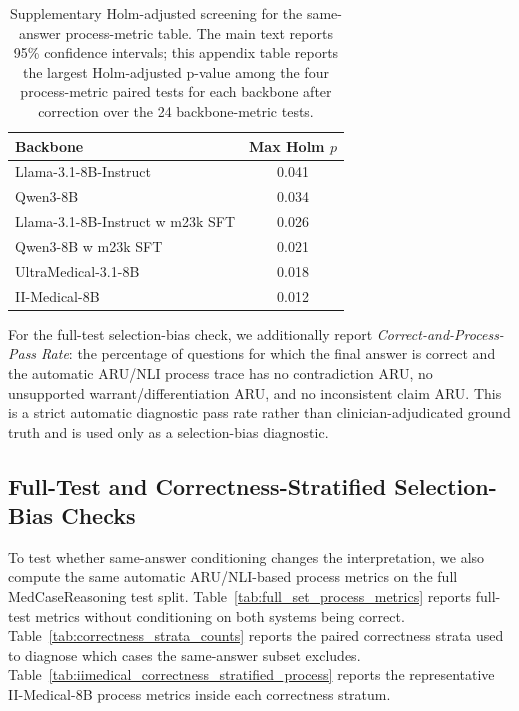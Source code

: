 \documentclass[a4paper,fleqn,doubleblind]{cas-sc}
\begin{document}
\begin{table}[htbp]
    \centering
    \footnotesize
    \caption{Supplementary Holm-adjusted screening for the same-answer process-metric table. The main text reports 95\% confidence intervals; this appendix table reports the largest Holm-adjusted p-value among the four process-metric paired tests for each backbone after correction over the 24 backbone-metric tests.}
    \label{tab:process_metric_holm_screening}
    \begin{tabular}{lc}
        \toprule
        \textbf{Backbone} & \textbf{Max Holm $p$} \\
        \midrule
        Llama-3.1-8B-Instruct & 0.041 \\
        Qwen3-8B & 0.034 \\
        Llama-3.1-8B-Instruct w m23k SFT & 0.026 \\
        Qwen3-8B w m23k SFT & 0.021 \\
        UltraMedical-3.1-8B & 0.018 \\
        II-Medical-8B & 0.012 \\
        \bottomrule
    \end{tabular}
\end{table}

For the full-test selection-bias check, we additionally report \textit{Correct-and-Process-Pass Rate}: the percentage of questions for which the final answer is correct and the automatic ARU/NLI process trace has no contradiction ARU, no unsupported warrant/differentiation ARU, and no inconsistent claim ARU. This is a strict automatic diagnostic pass rate rather than clinician-adjudicated ground truth and is used only as a selection-bias diagnostic.

\subsection{Full-Test and Correctness-Stratified Selection-Bias Checks}
\label{app:selection_bias_process}

To test whether same-answer conditioning changes the interpretation, we also compute the same automatic ARU/NLI-based process metrics on the full MedCaseReasoning test split. Table~\ref{tab:full_set_process_metrics} reports full-test metrics without conditioning on both systems being correct. Table~\ref{tab:correctness_strata_counts} reports the paired correctness strata used to diagnose which cases the same-answer subset excludes. Table~\ref{tab:iimedical_correctness_stratified_process} reports the representative II-Medical-8B process metrics inside each correctness stratum.
\end{document}
